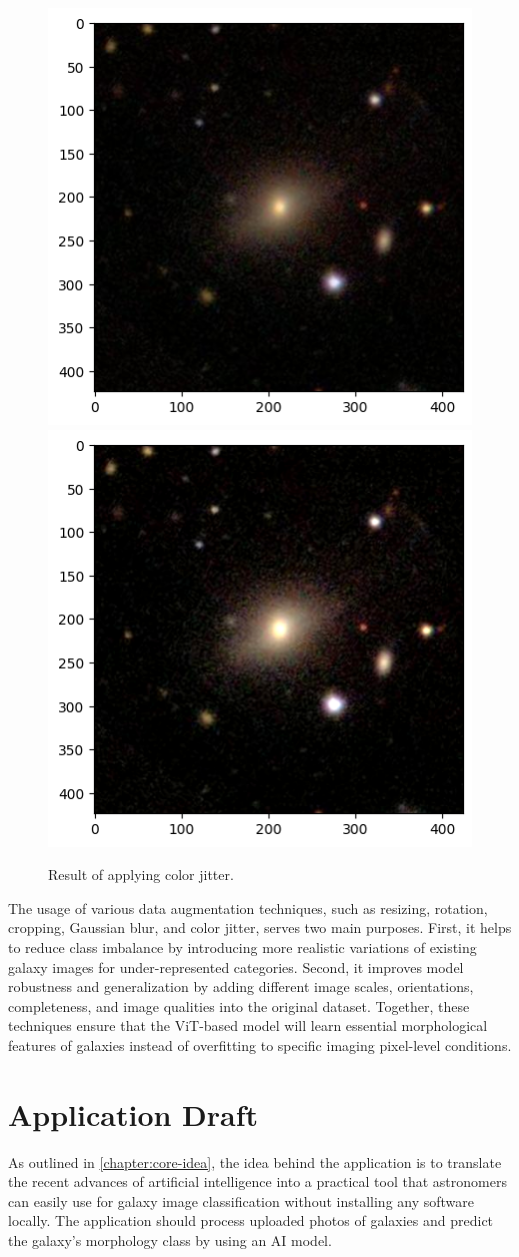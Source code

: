 \begin{figure}[htbp]\centering
  \centering
  \includegraphics[width=0.5\linewidth]{obrazky-figures/03-dataset/orig.png}\hfill
  \includegraphics[width=0.5\linewidth]{obrazky-figures/03-dataset/jitter.png}
  \caption{Result of applying color jitter.}
  \label{fig:dataset-jitter}
\end{figure}

The usage of various data augmentation techniques, such as resizing, rotation, cropping, Gaussian blur, and color jitter, serves two main purposes. First, it helps to reduce class imbalance by introducing more realistic variations of existing galaxy images for under-represented categories. Second, it improves model robustness and generalization by adding different image scales, orientations, completeness, and image qualities into the original dataset. Together, these techniques ensure that the ViT-based model will learn essential morphological features of galaxies instead of overfitting to specific imaging pixel-level conditions.

\chapter{Application Draft}

As outlined in \autoref{chapter:core-idea}, the idea behind the application is to translate the recent advances of artificial intelligence into a practical tool that astronomers can easily use for galaxy image classification without installing any software locally. The application should process uploaded photos of galaxies and predict the galaxy's morphology class by using an AI model.

